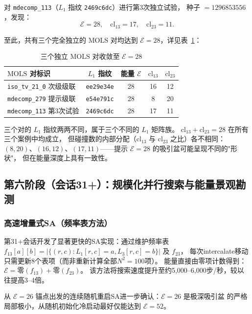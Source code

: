 \documentclass[11pt,a4paper]{ctexart}
\theoremstyle{remark}
\newcommand{\cl}{\mathrm{cl}}
\newcommand{\E}{\mathcal{E}}
\newcommand{\MOLS}{\mathrm{MOLS}}
\begin{document}
对 \texttt{mdecomp\_113}（$L_1$ 指纹 \texttt{2469c6dc}）进行第3次独立试验，
种子 $= 1296853556$，发现：
\[
  \E = 28,\quad \cl_{13} = 17,\quad \cl_{23} = 11.
\]

至此，共有三个完全独立的 $\MOLS$ 对均达到 $\E = 28$，详见表~\ref{tab:e28-convergence}：

\begin{table}[htbp]
  \centering
  \caption{三个独立 $\MOLS$ 对收敛至 $\E = 28$}
  \label{tab:e28-convergence}
  \begin{tabular}{lcccc}
    \toprule
    $\MOLS$ 对标识 & $L_1$ 指纹 & 能量 $\E$ & $\cl_{13}$ & $\cl_{23}$ \\
    \midrule
    \texttt{iso\_tv\_21\_0} 次级级联 & \texttt{ee29e34e} & 28 & 16 & 12 \\
    \texttt{mdecomp\_279} 提示级联 & \texttt{e54e791c} & 28 & 8  & 20 \\
    \texttt{mdecomp\_113} 第3次试验 & \texttt{2469c6dc} & 28 & 17 & 11 \\
    \bottomrule
  \end{tabular}
\end{table}

三个对的 $L_1$ 指纹两两不同，属于三个不同的 $L_1$ 矩阵族。
$\cl_{13} + \cl_{23} = 28$ 在所有三个案例中均成立，
但碰撞数的内部分配（$\cl_{13}$ 与 $\cl_{23}$ 之比）各不相同：
$(8,20)$、$(16,12)$、$(17,11)$——提示 $\E = 28$ 的吸引盆可能呈现不同的"形状"，
但在能量深度上具有一致性。

\subsection{第六阶段（会话31+）：规模化并行搜索与能量景观勘测}

\subsubsection{高速增量式SA（频率表方法）}

第31+会话开发了显著更快的SA实现：通过维护频率表
$f_{13}[a][b] = |\{(r,c) : L_1[r,c]=a, L_3[r,c]=b\}|$ 及 $f_{23}$，
每次intercalate移动只需更新8个表项（而非重新计算全部$N^2=100$项）。
能量直接由零项计数得到：$\E = \text{零}(f_{13}) + \text{零}(f_{23})$。
该方法将搜索速度提升至约5,000--6,000步/秒，较以往提高3--4倍。

从 $\E=26$ 锚点出发的连续随机重启SA进一步确认：$\E=26$ 是极深吸引盆
的严格局部极小，从随机初始化冷启动最好仅能达到 $\E=52$。
\end{document}
